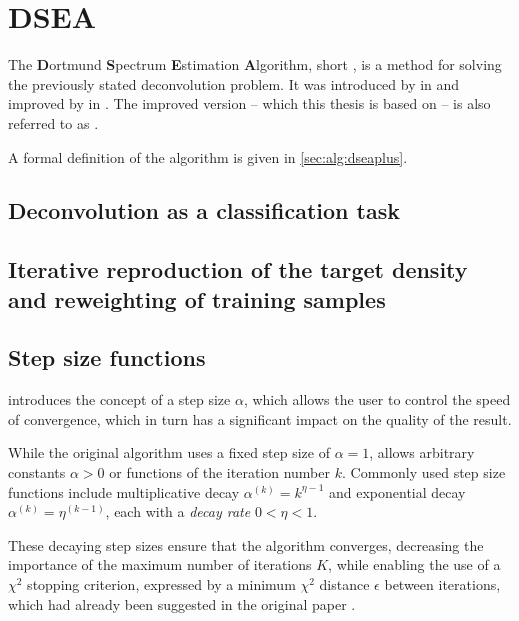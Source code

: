 \section{DSEA} %
The \textbf{D}ortmund \textbf{S}pectrum \textbf{E}stimation \textbf{A}lgorithm,
  short \dsea,
is a method for solving the previously stated deconvolution problem.
It was introduced by \citeauthor{dsea_tim} in \citeyear{dsea_tim}
and improved by \citeauthor{dsea_mirko} in \citeyear{dsea_mirko}.
The improved version
  – which this thesis is based on –
is also referred to as \dseaplus{}.

A formal definition of the \dseaplus{} algorithm is given in \autoref{sec:alg:dseaplus}.


\subsection{Deconvolution as a classification task} %
\blindtext[2]


\subsection{Iterative reproduction of the target density and reweighting of training samples} %
\blindtext[4]


\subsection{Step size functions} \label{sec:dsea:dsea:stepsize}
\dseaplus{} introduces the concept of a step size $\alpha$,
which allows the user to control the speed of convergence,
which in turn has a significant impact on the quality of the result.

While the original \dsea{} algorithm uses a fixed step size of $\alpha = 1$,
\dseaplus{} allows arbitrary constants $\alpha > 0$
or functions of the iteration number $k$.
Commonly used step size functions include
multiplicative decay
  $\alpha^{(k)} = k^{\eta - 1}$
and exponential decay
  $\alpha^{(k)} = \eta^{(k - 1)}$,
each with a \emph{decay rate} $0 < \eta < 1$.

These decaying step sizes ensure that the algorithm converges,
decreasing the importance of the maximum number of iterations $K$,
while enabling the use of a $\chi^2$ stopping criterion,
  expressed by a minimum $\chi^2$ distance $\epsilon$ between iterations,
  which had already been suggested in the original \dsea{} paper \cite{dsea_tim}.


